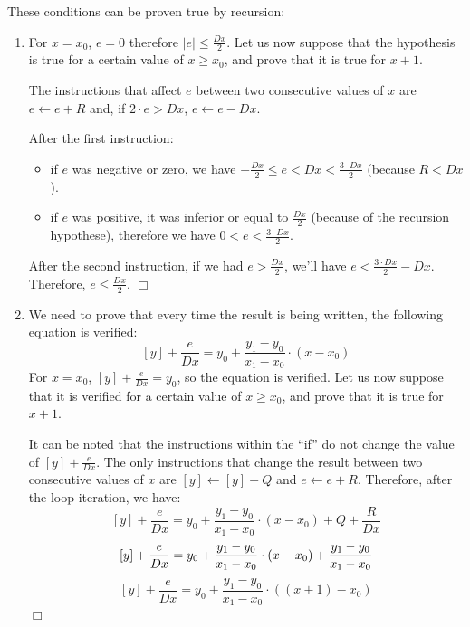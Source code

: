 \documentclass[a4paper,11pt]{kthesis}
\begin{document}
These conditions can be proven true by recursion:
\begin{enumerate}
\item For $x = x_{0}$, $e = 0$ therefore $|e| \leq \frac{Dx}{2}$. Let us now suppose that the hypothesis is true for a certain value of $x \geq x_{0}$, and prove that it is true for $x+1$.

The instructions that affect $e$ between two consecutive values of $x$ are $e \leftarrow e + R$ and, if $2\cdot e > Dx$, $e \leftarrow e - Dx$.

After the first instruction:
\begin{itemize}
\item if $e$ was negative or zero, we have $-\frac{Dx}{2} \leq e < Dx < \frac{3 \cdot Dx}{2} $ (because $R < Dx$).
\item if $e$ was positive, it was inferior or equal to $\frac{Dx}{2}$ (because of the recursion hypothese), therefore we have $0 < e < \frac{3 \cdot Dx}{2} $.
\end{itemize}
After the second instruction, if we had $e > \frac{Dx}{2}$, we'll have $e < \frac{3 \cdot Dx}{2} - Dx$. Therefore, $e \leq \frac{Dx}{2}$. $\Box$

\item We need to prove that every time the result is being written, the following equation is verified:
\begin{equation}
\hspace{0cm} [y] + \frac{e}{Dx} = y_{0} + \frac{y_{1}-y_{0}}{x_{1}-x_{0}} \cdot (x - x_{0})
\end{equation}
For $x = x_{0}$, $[y] + \frac{e}{Dx} = y_{0}$, so the equation is verified. Let us now suppose that it is verified for a certain value of $x \geq x_{0}$, and prove that it is true for $x+1$.

It can be noted that the instructions within the ``if'' do not change the value of $[y] + \frac{e}{Dx}$. The only instructions that change the result between two consecutive values of $x$ are $[y] \leftarrow [y] + Q$ and $e \leftarrow e + R$. Therefore, after the loop iteration, we have:
\begin{equation}
\hspace{0cm} [y] + \frac{e}{Dx} = y_{0} + \frac{y_{1}-y_{0}}{x_{1}-x_{0}} \cdot (x - x_{0}) + Q + \frac{R}{Dx}
\end{equation}
\begin{equation}
\hspace{0cm} [y] + \frac{e}{Dx} = y_{0} + \frac{y_{1}-y_{0}}{x_{1}-x_{0}} \cdot (x - x_{0}) + \frac{y_{1}-y_{0}}{x_{1}-x_{0}} \\
\end{equation}
\begin{equation}
\hspace{0cm} [y] + \frac{e}{Dx} = y_{0} + \frac{y_{1}-y_{0}}{x_{1}-x_{0}} \cdot ((x + 1) - x_{0})
\end{equation}
$\Box$
\end{enumerate}
\end{document}
